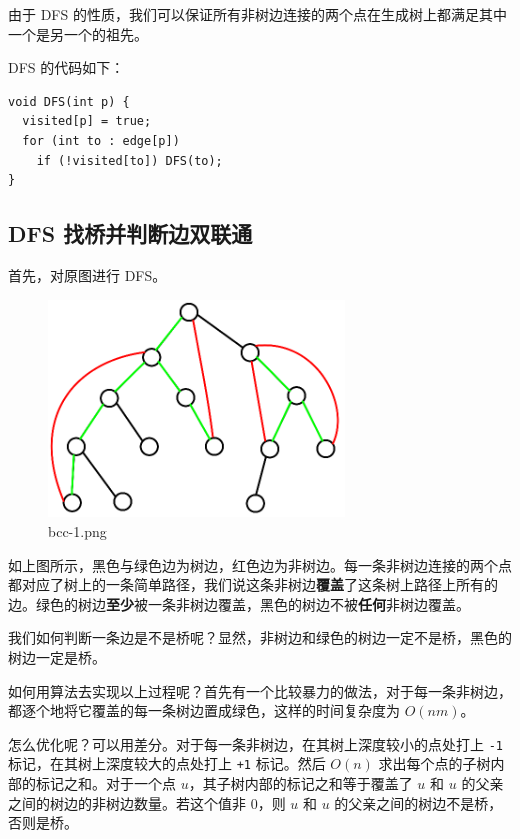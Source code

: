 由于 DFS 的性质，我们可以保证所有非树边连接的两个点在生成树上都满足其中一个是另一个的祖先。

DFS 的代码如下：

\begin{verbatim}
void DFS(int p) {
  visited[p] = true;
  for (int to : edge[p])
    if (!visited[to]) DFS(to);
}
\end{verbatim}

\subsection{DFS 找桥并判断边双联通}

首先，对原图进行 DFS。

\begin{figure}[htbp]
\centering
\includegraphics[width=0.7\textwidth]{docs/graph/images/bcc-1.png} 
\caption{bcc-1.png}
\end{figure}

如上图所示，黑色与绿色边为树边，红色边为非树边。每一条非树边连接的两个点都对应了树上的一条简单路径，我们说这条非树边\textbf{覆盖}了这条树上路径上所有的边。绿色的树边\textbf{至少}被一条非树边覆盖，黑色的树边不被\textbf{任何}非树边覆盖。

我们如何判断一条边是不是桥呢？显然，非树边和绿色的树边一定不是桥，黑色的树边一定是桥。

如何用算法去实现以上过程呢？首先有一个比较暴力的做法，对于每一条非树边，都逐个地将它覆盖的每一条树边置成绿色，这样的时间复杂度为 $O(nm)$。

怎么优化呢？可以用差分。对于每一条非树边，在其树上深度较小的点处打上 \texttt{-1} 标记，在其树上深度较大的点处打上 \texttt{+1} 标记。然后 $O(n)$ 求出每个点的子树内部的标记之和。对于一个点 $u$，其子树内部的标记之和等于覆盖了 $u$ 和 $u$ 的父亲之间的树边的非树边数量。若这个值非 $0$，则 $u$ 和 $u$ 的父亲之间的树边不是桥，否则是桥。

